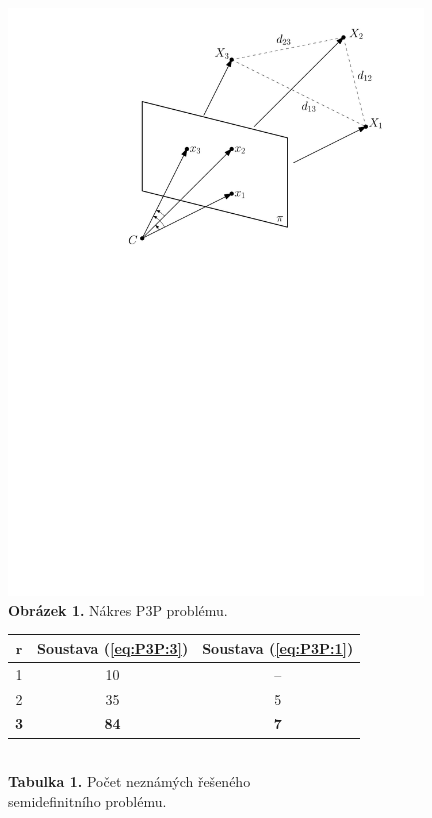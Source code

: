 \documentclass[cmpiitalkstyle, 22pt]{cmptalk}
\begin{document}
{  \vspace{-17cm}\hspace{16cm}\includegraphics[width=11cm]{drawings/P3P}\\
  \hspace{16cm}\textbf{Obrázek 1. }Nákres P3P problému.\\[2cm]
  \hspace{16cm}\begin{tabular}{|c||c|c|}
    \hline
    $\boldsymbol{r}$ & \textbf{Soustava (\ref{eq:P3P:3})} & \textbf{Soustava (\ref{eq:P3P:1})}\\\hline\hline
    1 & 10 & --\\
    2 & 35 & 5\\
    \textbf{3} & \textbf{84} & \textbf{7}\\\hline
  \end{tabular}\\[5mm]
  \hspace{16cm}\textbf{Tabulka 1. }Počet neznámých řešeného\\
  \hspace{16cm}semidefinitního problému.
}
\end{document}
